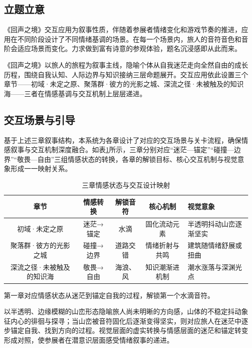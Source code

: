 \documentclass[bachelor]{njupthesis}
\begin{document}
\subsection{立题立意}

《回声之境》交互应用为叙事性质，伴随着参展者情绪变化和游戏节奏的推进，应用在不同阶段设计了不同情绪基调的场景。在每一个场景内，旅人的音符音色和音阶会适应场景而变化。力求做到富有诗意的参观体验，题名沉浸感即从此而来。

《回声之境》以旅人的旅程为叙事主线，隐喻个体从自我迷茫走向全然自由的成长历程，围绕自我认知、人际边界与知识接纳三层命题展开。交互应用依此设置三个章节——初域·未定之原、聚落群·彼方的光影之城、深流之径·未被触及的知识海——三者在情感基调与交互机制上层层递进。

\subsection{交互场景与引导}

基于上述三章叙事结构，本系统为各章设计了对应的交互场景与关卡流程，确保情感叙事与交互机制深度融合。如表\ref{tbl:chapter-emotion}所示，三章分别对应“迷茫—锚定”“碰撞—边界”“敬畏—自由”三组情感状态的转换，各章的解锁目标、核心交互机制与视觉意象形成一一映射关系。

\begin{table}[h]
\centering
\caption{三章情感状态与交互设计映射}
\begin{tabularx}{\linewidth}{ccccX}
\toprule
\textbf{章节} & \textbf{情感转换} & \textbf{解锁音符} & \textbf{核心机制} & \textbf{视觉意象} \\
\midrule
初域·未定之原 & 迷茫→锚定 & 水滴 & 固化流动元素 & 半透明抖动山峦逐渐坚实 \\
聚落群·彼方的光影之城 & 碰撞→边界 & 道路交错 & 情绪折射与共鸣 & 建筑随情绪舒展或扭曲 \\
深流之径·未被触及的知识海 & 敬畏→自由 & 海浪、风 & 知识潮渐进机制 & 潮水涨落与深渊光点 \\
\bottomrule
\end{tabularx}
\label{tbl:chapter-emotion}
\end{table}

第一章对应情感状态从迷茫到锚定自我的过程，解锁第一个水滴音符。

以半透明、边缘模糊的山峦形态隐喻旅人尚未明晰的方向感，山体的不稳定抖动象征内心的徘徊与探寻；当山峦被音符固化后逐渐变得坚实，则对应旅人在迷茫中逐步锚定自我、找到方向的过程。视觉层面的虚实转换与情感层面的迷茫和锚定转变形成对照，使参展者在潜意识层面感受情绪叙事的递进。
\end{document}
